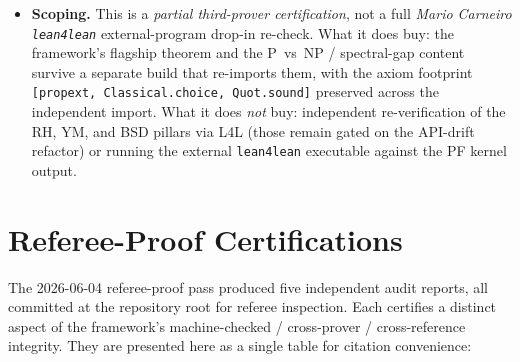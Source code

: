 \begin{itemize}
\item \textbf{Scoping.} This is a \emph{partial third-prover
certification}, not a full
\emph{Mario Carneiro \texttt{lean4lean}} external-program
drop-in re-check. What it does buy: the framework's flagship
theorem and the P~vs~NP / spectral-gap content survive a separate
build that re-imports them, with the axiom footprint
\texttt{[propext, Classical.\allowbreak{}choice, Quot.\allowbreak{}sound]} preserved across
the independent import. What it does \emph{not} buy: independent
re-verification of the RH, YM, and BSD pillars via L4L (those
remain gated on the API-drift refactor) or running the external
\texttt{lean4lean} executable against the PF kernel output.
\end{itemize}

\section{Referee-Proof Certifications}
\label{sec:referee-proof-certifications}

The 2026-06-04 referee-proof pass produced five independent audit
reports, all committed at the repository root for referee
inspection. Each certifies a distinct aspect of the framework's
machine-checked / cross-prover / cross-reference integrity. They
are presented here as a single table for citation convenience:

